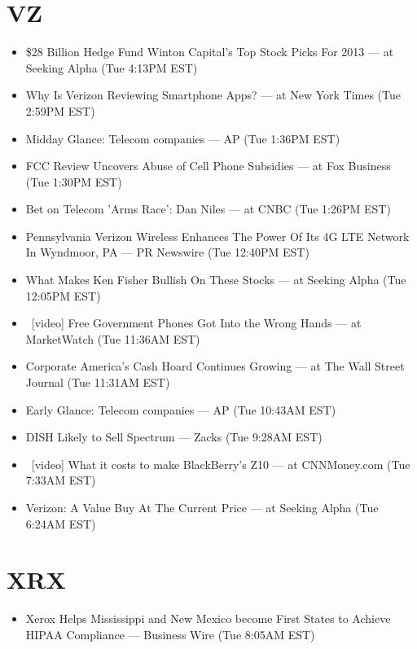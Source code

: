 \documentclass[11pt,asymmetric]{article}
\begin{document}
\section*{VZ}
\begin{itemize}
\item \$28 Billion Hedge Fund Winton Capital's Top Stock Picks For 2013 --- at Seeking Alpha (Tue 4:13PM EST)
\item Why Is Verizon Reviewing Smartphone Apps? --- at New York Times (Tue 2:59PM EST)
\item Midday Glance: Telecom companies --- AP (Tue 1:36PM EST)
\item FCC Review Uncovers Abuse of Cell Phone Subsidies --- at Fox Business (Tue 1:30PM EST)
\item Bet on Telecom 'Arms Race': Dan Niles --- at CNBC (Tue 1:26PM EST)
\item Pennsylvania Verizon Wireless Enhances The Power Of Its 4G LTE Network In Wyndmoor, PA --- PR Newswire (Tue 12:40PM EST)
\item What Makes Ken Fisher Bullish On These Stocks --- at Seeking Alpha (Tue 12:05PM EST)
\item\ [video] Free Government Phones Got Into the Wrong Hands --- at MarketWatch (Tue 11:36AM EST)
\item Corporate America's Cash Hoard Continues Growing --- at The Wall Street Journal (Tue 11:31AM EST)
\item Early Glance: Telecom companies --- AP (Tue 10:43AM EST)
\item DISH Likely to Sell Spectrum --- Zacks (Tue 9:28AM EST)
\item\ [video] What it costs to make BlackBerry's Z10 --- at CNNMoney.com (Tue 7:33AM EST)
\item Verizon: A Value Buy At The Current Price --- at Seeking Alpha (Tue 6:24AM EST)
\end{itemize}

\section*{XRX}
\begin{itemize}
\item Xerox Helps Mississippi and New Mexico become First States to Achieve HIPAA Compliance --- Business Wire (Tue 8:05AM EST)
\end{itemize}
\end{document}

